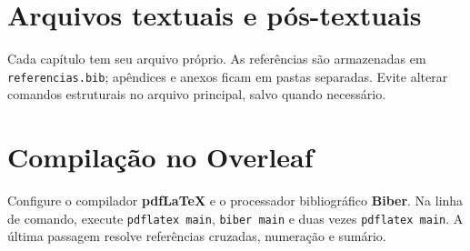 \section{Arquivos textuais e pós-textuais}
Cada capítulo tem seu arquivo próprio. As referências são armazenadas em \texttt{referencias.bib}; apêndices e anexos ficam em pastas separadas. Evite alterar comandos estruturais no arquivo principal, salvo quando necessário.

\section{Compilação no Overleaf}
Configure o compilador \textbf{pdfLaTeX} e o processador bibliográfico \textbf{Biber}. Na linha de comando, execute \texttt{pdflatex main}, \texttt{biber main} e duas vezes \texttt{pdflatex main}. A última passagem resolve referências cruzadas, numeração e sumário.
